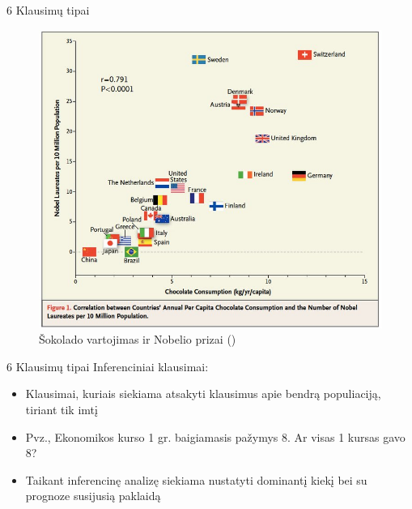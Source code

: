 \documentclass[11pt,xcolor=table]{beamer}
\begin{document}
\begin{frame}{6 Klausimų tipai}
\begin{figure}
\caption{Šokolado vartojimas ir Nobelio prizai (\href{https://www.nejm.org/doi/full/10.1056/NEJMon1211064}{\color{blue}{Franz H. Messerli, M.D., 2012}})}
\includegraphics[scale=0.28]{schockolade_nobel.jpg}
\end{figure}
\end{frame}


\begin{frame}{6 Klausimų tipai}
Inferenciniai klausimai:
\begin{itemize}
\item Klausimai, kuriais siekiama atsakyti klausimus apie bendrą populiaciją, tiriant tik imtį
\item Pvz., Ekonomikos kurso 1 gr. baigiamasis pažymys 8. Ar visas 1 kursas gavo 8?
\item Taikant inferencinę analizę siekiama nustatyti dominantį kiekį bei su prognoze susijusią paklaidą
\end{itemize}
\end{frame}
\end{document}
